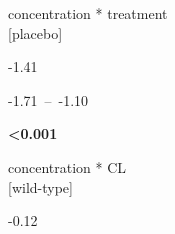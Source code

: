 \documentclass[
  letterpaper,
  DIV=11,
  numbers=noendperiod]{scrartcl}
\begin{document}
\begin{table}
\begin{minipage}[t]{\linewidth}
{}

\end{minipage}%
\newline
\begin{minipage}[t]{\linewidth}

{\centering 

concentration * treatment\\
{[}placebo{]}

}

\end{minipage}%
\newline
\begin{minipage}[t]{\linewidth}

{\centering 

-1.41

}

\end{minipage}%
\newline
\begin{minipage}[t]{\linewidth}

{\centering 

-1.71~--~-1.10

}

\end{minipage}%
\newline
\begin{minipage}[t]{\linewidth}

{\centering 

\textbf{\textless0.001}

}

\end{minipage}%
\newline
\begin{minipage}[t]{\linewidth}

{\centering 

concentration * CL\\
{[}wild-type{]}

}

\end{minipage}%
\newline
\begin{minipage}[t]{\linewidth}

{\centering 

-0.12

}

\end{minipage}%
\newline
\begin{minipage}[t]{\linewidth}


\end{minipage}
\end{table}
\end{document}
